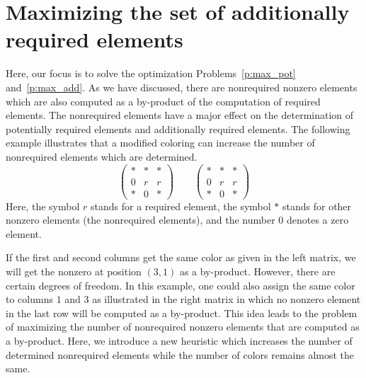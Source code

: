 \documentclass[12pt, twoside,a4paper,toc=bibliography]{scrbook}
\begin{document}
\section{Maximizing the set of additionally required elements}
\label{s.max.pot.req}
Here, our focus is to solve the optimization Problems~\ref{p:max_pot} and~\ref{p:max_add}.
As we have discussed, there are nonrequired nonzero elements
which are also computed as a by-product of the computation of required elements.
The nonrequired elements have a major effect on
the determination of potentially required elements
and additionally required elements.
The following example illustrates that
a modified coloring can increase the number of nonrequired elements
which are determined.
\begin{equation}
\left(\begin{array}{rrb}
* & * & *\\
0 & r & r \\
* & 0 & *
\end{array}\right)
\qquad
\left(\begin{array}{rbr}
* & * & *\\
0 & r & r \\
* & 0 & *
\end{array}\right)
\label{twocolorings}
\end{equation}
Here, the symbol $r$ stands for a required element,
the symbol \textit{$*$} stands for other nonzero elements (the nonrequired elements),
and the number $0$ denotes a zero element.

If the first and second columns get the same color as given in the left matrix,
we will get the nonzero at position $(3,1)$ as a by-product.
However, there are certain degrees of freedom. In
this example, one could also assign the same color to columns $1$ and
$3$ as illustrated in the right matrix
in which no nonzero element in the last row will be computed
as a by-product. This idea leads to the problem of maximizing
the number of nonrequired nonzero elements that are computed as a by-product.
Here, we introduce a new heuristic which increases the number of determined nonrequired elements
while the number of colors remains almost the same.
\end{document}
